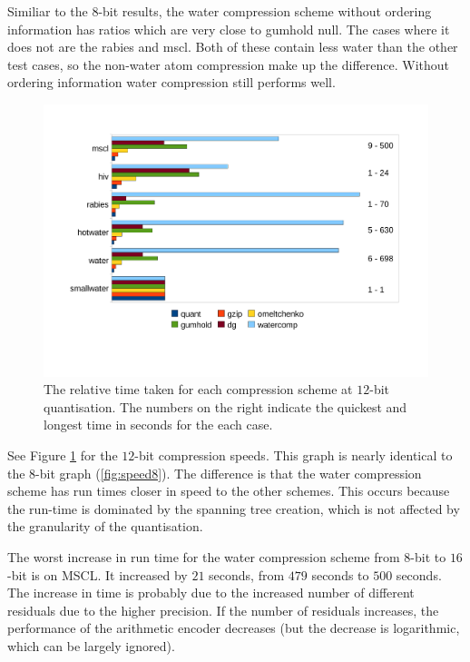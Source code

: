 \documentclass[a4paper]{report}
\begin{document}
Similiar to the $8$-bit results, the water compression scheme without ordering
information has ratios which are very close to gumhold null. The cases where
it does not are the rabies and mscl. Both of these contain less water than the
other test cases, so the non-water atom compression make up the
difference. Without ordering information water compression still performs
well.

\begin{figure}[h]
\centering
\includegraphics[trim = 10mm 25mm 10mm 20mm, clip, width=\textwidth]{images/speed12}
\caption{The relative time taken for each compression scheme at $12$-bit
  quantisation. The numbers on the right indicate the quickest and longest
  time in seconds for the each case.}
\label{fig:speed12}
\end{figure}

See Figure \ref{fig:speed12} for the $12$-bit compression speeds. This graph
is nearly identical to the $8$-bit graph (\ref{fig:speed8}). The difference is
that the water compression scheme has run times closer in speed to the other
schemes. This occurs because the run-time is dominated by the spanning tree
creation, which is not affected by the granularity of the quantisation.

The worst increase in run time for the water compression scheme from $8$-bit
to $16$-bit is on MSCL. It increased by $21$ seconds, from $479$ seconds to
$500$ seconds. The increase in time is probably due to the increased number of
different residuals due to the higher precision. If the number of residuals
increases, the performance of the arithmetic encoder decreases (but the
decrease is logarithmic, which can be largely ignored).
\end{document}
